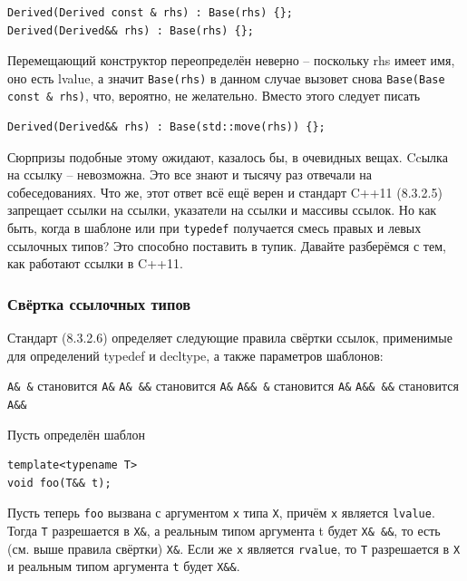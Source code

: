 \documentclass[a4paper,12pt,oneside]{article}
\begin{document}
\begin{lstlisting}
Derived(Derived const & rhs) : Base(rhs) {};
Derived(Derived&& rhs) : Base(rhs) {};
\end{lstlisting}

Перемещающий конструктор переопределён неверно -- поскольку rhs имеет имя, оно есть lvalue, а значит \lstinline!Base(rhs)! в данном случае вызовет снова \lstinline!Base(Base const & rhs)!, что, вероятно, не желательно. Вместо этого следует писать

\begin{lstlisting}
Derived(Derived&& rhs) : Base(std::move(rhs)) {};
\end{lstlisting}

Сюрпризы подобные этому ожидают, казалось бы, в очевидных вещах. Ccылка на ссылку -- невозможна. Это все знают и тысячу раз отвечали на собеседованиях. Что же, этот ответ всё ещё верен и стандарт C++11 (8.3.2.5) запрещает ссылки на ссылки, указатели на ссылки и массивы ссылок. Но как быть, когда в шаблоне или при \lstinline!typedef! получается смесь правых и левых ссылочных типов? Это способно поставить в тупик. Давайте разберёмся с тем, как работают ссылки в C++11.

\subsubsection{Свёртка ссылочных типов}

Стандарт (8.3.2.6) определяет следующие правила свёртки ссылок, применимые для определений typedef и decltype, а также параметров шаблонов:

\lstinline!A& &! становится \lstinline!A&!
\lstinline!A& &&! становится \lstinline!A&!
\lstinline!A&& &! становится \lstinline!A&!
\lstinline!A&& &&! становится \lstinline!A&&!

Пусть определён шаблон

\begin{lstlisting}
template<typename T>
void foo(T&& t);
\end{lstlisting}

Пусть теперь \lstinline!foo! вызвана с аргументом \lstinline!x! типа \lstinline!X!, причём \lstinline!x! является \lstinline!lvalue!. Тогда \lstinline!T! разрешается в \lstinline!X&!, а реальным типом аргумента t будет \lstinline!X& &&!, то есть (см. выше правила свёртки) \lstinline!X&!. Если же \lstinline!x! является \lstinline!rvalue!, то \lstinline!T! разрешается в \lstinline!X! и реальным типом аргумента \lstinline!t! будет \lstinline!X&&!.
\end{document}
